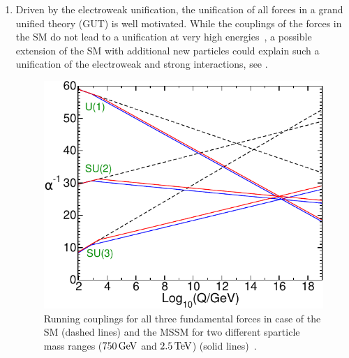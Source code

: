 \begin{enumerate}
\item Driven by the electroweak unification, the unification of all forces in a grand unified theory (GUT) is well motivated. While the couplings of the forces in the SM do not lead to a unification at very high energies~\cite{PDG}, a possible extension of the SM with additional new particles could explain such a unification of the electroweak and strong interactions, see .
\begin{figure}
 \centering
 \includegraphics[width=\pairwidth]{figures/general/couplings}
 \caption{Running couplings for all three fundamental forces in case of the SM (dashed lines) and the MSSM for two different sparticle mass ranges ($750\,\text{Ge\hspace{-.08em}V}$ and $2.5\,\text{Te\hspace{-.08em}V}$) (solid lines)~\cite{SUSYPrimer}.}
 \label{fig:couplings}
\end{figure}




\end{enumerate}
